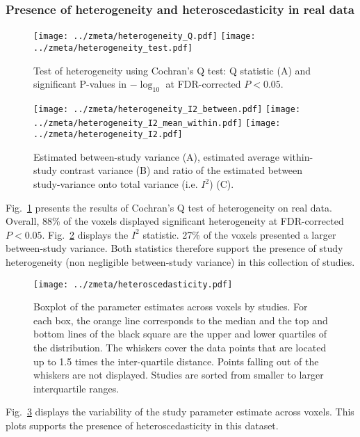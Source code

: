 \documentclass[preprint]{elsarticle}
\begin{document}
\subsubsection{Presence of heterogeneity and heteroscedasticity in real data}

\begin{figure}[h]
	\centering
 	\texttt{[image: ../zmeta/heterogeneity\_Q.pdf]}
 	\texttt{[image: ../zmeta/heterogeneity\_test.pdf]}
	\caption{Test of heterogeneity using Cochran's Q test: Q statistic (A) and significant P-values in $-\log_{10}$ at FDR-corrected $P<0.05$.}
	\label{fig:heterogeneity_Q}
\end{figure}

\begin{figure}[h]
	\centering
 	\texttt{[image: ../zmeta/heterogeneity\_I2\_between.pdf]}
 	\texttt{[image: ../zmeta/heterogeneity\_I2\_mean\_within.pdf]}
 	\texttt{[image: ../zmeta/heterogeneity\_I2.pdf]}
	\caption{Estimated between-study variance (A), estimated average within-study contrast variance (B) and ratio of the estimated between study-variance onto total variance (i.e. $I^2$) (C).}
	\label{fig:heterogeneity_I2}
\end{figure}

Fig.~\ref{fig:heterogeneity_Q} presents the results of Cochran's Q test of heterogeneity on real data. Overall, 88\% of the voxels displayed significant heterogeneity at FDR-corrected $P < 0.05$. 
Fig.~\ref{fig:heterogeneity_I2} displays the $I^2$ statistic. 27\% of the voxels presented a larger between-study variance. Both statistics therefore support the presence of study heterogeneity (non negligible between-study variance) in this collection of studies.

\begin{figure}[h]
	\centering
 	\texttt{[image: ../zmeta/heteroscedasticity.pdf]}
	\caption{Boxplot of the parameter estimates across voxels by studies. For each box, the orange line corresponds to the median
and the top and bottom lines of the black square are the upper and lower quartiles of the distribution. The whiskers cover the data
points that are located up to 1.5 times the inter-quartile distance. Points falling out of the whiskers are not displayed. Studies are sorted from smaller to larger interquartile ranges.}
	\label{fig:heteroscedasticity}
\end{figure}

Fig.~\ref{fig:heteroscedasticity} displays the variability of the study parameter estimate across voxels. This plots supports the presence of heteroscedasticity in this dataset.
\end{document}
